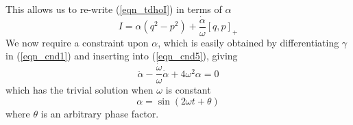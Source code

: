 \documentclass[11pt, a4paper, titlepage]{article}
\begin{document}
This allows us to re-write (\ref{eqn_tdhoI}) in terms of $\alpha$
\begin{equation}
  \label{eqn_tdhoIa}
  I = \alpha \left( q^2 - p^2 \right) + \frac{\dot{\alpha}}{\omega} [q, p]_+
\end{equation}
We now require a constraint upon $\alpha$, which is easily obtained by
differentiating $\gamma$ in (\ref{eqn_cnd1}) and inserting into
(\ref{eqn_cnd5}), giving
\begin{equation}
  \label{eqn_cnsrnta}
  \ddot{\alpha} - \frac{\dot{\omega}}{\omega}\dot{\alpha} + 4\omega^2 \alpha = 0
\end{equation}
which has the trivial solution when $\omega$ is constant
\begin{equation}
  \label{eqn_cnsrntcnsta}
   \alpha = \sin (2\omega t + \theta)
\end{equation}
where $\theta$ is an arbitrary phase factor.
\end{document}

